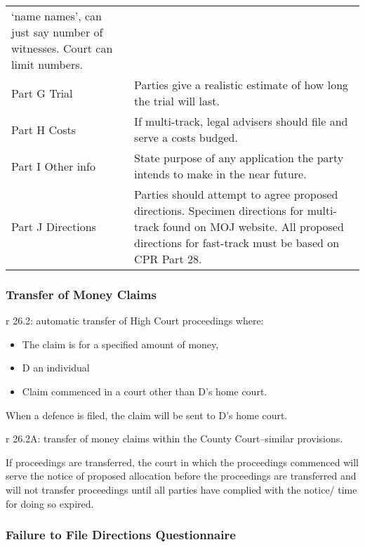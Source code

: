 \documentclass[
]{article}
\providecommand{\tightlist}{%
  \setlength{\itemsep}{0pt}\setlength{\parskip}{0pt}}
\begin{document}
\begin{longtable}[]{@{}
  >{\raggedright\arraybackslash}p{}
  >{\raggedright\arraybackslash}p{}@{}}
`name names', can just say number of witnesses. Court can limit
numbers. \\
Part G Trial & Parties give a realistic estimate of how long the trial
will last. \\
Part H Costs & If multi-track, legal advisers should file and serve a
costs budged. \\
Part I Other info & State purpose of any application the party intends
to make in the near future. \\
Part J Directions & Parties should attempt to agree proposed directions.
Specimen directions for multi-track found on MOJ website. All proposed
directions for fast-track must be based on CPR Part 28. \\
\bottomrule()
\end{longtable}

\hypertarget{transfer-of-money-claims}{%
\subsubsection{Transfer of Money
Claims}\label{transfer-of-money-claims}}

r 26.2: automatic transfer of High Court proceedings where:

\begin{itemize}
\tightlist
\item
  The claim is for a specified amount of money,
\item
  D an individual
\item
  Claim commenced in a court other than D's home court.
\end{itemize}

When a defence is filed, the claim will be sent to D's home court.

r 26.2A: transfer of money claims within the County Court--similar
provisions.

If proceedings are transferred, the court in which the proceedings
commenced will serve the notice of proposed allocation before the
proceedings are transferred and will not transfer proceedings until all
parties have complied with the notice/ time for doing so expired.

\hypertarget{failure-to-file-directions-questionnaire}{%
\subsubsection{Failure to File Directions
Questionnaire}\label{failure-to-file-directions-questionnaire}}
\end{document}

